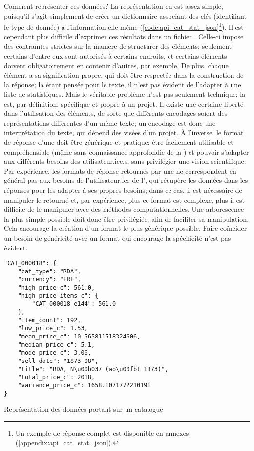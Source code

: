 Comment représenter ces données? La représentation en \json{} est assez simple, puisqu'il s'agit simplement de créer un \gls{dictionnaire} associant des clés (identifiant le type de donnée) à l'information elle-même (\ref{code:api_cat_stat_json}\footnote{
	Un exemple de réponse complet est disponible en annexes (\ref{appendix:api_cat_stat_json}).
}). Il est cependant plus difficile d'exprimer ces résultats dans un fichier \tei{}. Celle-ci impose des contraintes strictes sur la manière de structurer des éléments: seulement certains d'entre eux sont autorisés à certains endroits, et certains éléments doivent obligatoirement en contenir d'autres, par exemple. De plus, chaque élément a sa signification propre, qui doit être respectée dans la construction de la réponse; la \tei{} étant pensée pour le texte, il n'est pas évident de l'adapter à une liste de statistiques. Mais le véritable problème n'est pas seulement technique: la \tei{} est, par définition, spécifique et propre à un projet. Il existe une certaine liberté dans l'utilisation des éléments, de sorte que différents encodages soient des représentations différentes d'un même texte; un encodage est donc une interprétation du texte, qui dépend des visées d'un projet. À l'inverse, le format de réponse d'une \api{} doit être générique et pratique: être facilement utilisable et compréhensible (même sans connaissance approfondie de la \tei{}) et pouvoir s'adapter aux différents besoins des utilisateur.ice.s, sans privilégier une vision scientifique. Par expérience, les formats de réponse retournés par une \api{} ne correspondent en général pas aux besoins de l'utilisateur.ice de l'\api{}, qui récupère les données dans les réponses pour les adapter à ses propres besoins; dans ce cas, il est nécessaire de manipuler le \xml{} retourné et, par expérience, plus ce format est complexe, plus il est difficile de le manipuler avec des méthodes computationnelles. Une arborescence la plus simple possible doit donc être privilégiée, afin de faciliter sa manipulation. Cela encourage la création d'un format le plus générique possible. Faire coïncider un besoin de généricité avec un format qui encourage la spécificité n'est pas évident. 


\begin{listing}[h!]
	\begin{verbatim}
"CAT_000018": {
	"cat_type": "RDA",
	"currency": "FRF",
	"high_price_c": 561.0,
	"high_price_items_c": {
		"CAT_000018_e144": 561.0
	},
	"item_count": 192,
	"low_price_c": 1.53,
	"mean_price_c": 10.565811518324606,
	"median_price_c": 5.1,
	"mode_price_c": 3.06,
	"sell_date": "1873-08",
	"title": "RDA, N\u00b037 (ao\u00fbt 1873)",
	"total_price_c": 2018,
	"variance_price_c": 1658.1071772210191
}
	\end{verbatim}
	\caption{Représentation \json{} des données portant sur un catalogue}
	\label{code:api_cat_stat_json}
\end{listing}

